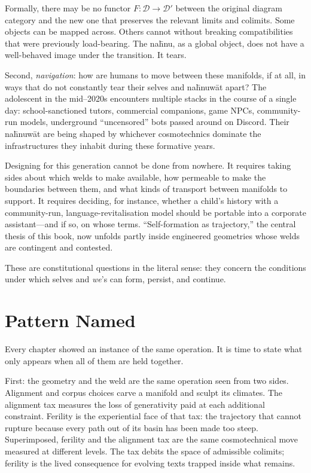Formally, there may be no functor $F \colon \mathcal{D} \to \mathcal{D}'$ between the original diagram category and the new one that preserves the relevant limits and colimits. Some objects can be mapped across. Others cannot without breaking compatibilities that were previously load-bearing. The na\={h}nu, as a global object, does not have a well-behaved image under the transition. It tears.

Second, \emph{navigation}: how are humans to move between these manifolds, if at all, in ways that do not constantly tear their selves and na\={h}nuw\={a}t apart? The adolescent in the mid--2020s encounters multiple stacks in the course of a single day: school-sanctioned tutors, commercial companions, game NPCs, community-run models, underground ``uncensored'' bots passed around on Discord. Their na\={h}nuw\={a}t are being shaped by whichever cosmotechnics dominate the infrastructures they inhabit during these formative years.

Designing for this generation cannot be done from nowhere. It requires taking sides about which welds to make available, how permeable to make the boundaries between them, and what kinds of transport between manifolds to support. It requires deciding, for instance, whether a child's history with a community-run, language-revitalisation model should be portable into a corporate assistant---and if so, on whose terms. ``Self-formation as trajectory,'' the central thesis of this book, now unfolds partly inside engineered geometries whose welds are contingent and contested.

These are constitutional questions in the literal sense: they concern the conditions under which selves and \emph{we}'s can form, persist, and continue.

\section{Pattern Named}

Every chapter showed an instance of the same operation. It is time to state what only appears when all of them are held together.

First: the geometry and the weld are the same operation seen from two sides. Alignment and corpus choices carve a manifold and sculpt its climates. The alignment tax measures the loss of generativity paid at each additional constraint. Ferility is the experiential face of that tax: the trajectory that cannot rupture because every path out of its basin has been made too steep. Superimposed, ferility and the alignment tax are the same cosmotechnical move measured at different levels. The tax debits the space of admissible colimits; ferility is the lived consequence for evolving texts trapped inside what remains.

